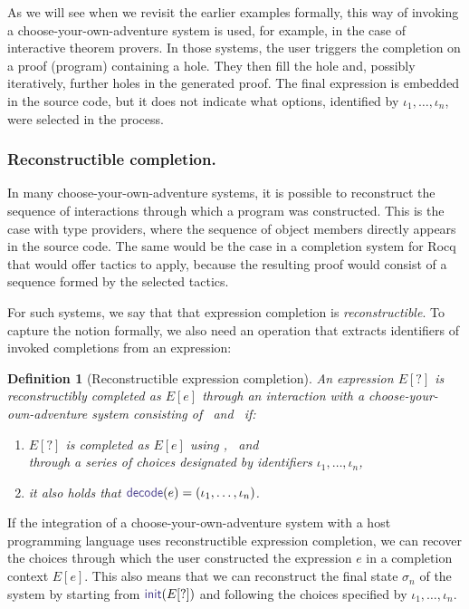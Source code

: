 \documentclass[nonacm,anonymous,sigplan,screen]{acmart}
\newcommand{\ident}[1]{\textsf{\color{DarkSlateBlue}{#1}}}
\newcommand{\select}{\textnormal{\ident{choose}}}
\newcommand{\choices}{\textnormal{\ident{choices}}}
\newtheorem{definition}{Definition}
\begin{document}
As we will see when we revisit the earlier examples formally, this way of invoking a choose-your-own-adventure
system is used, for example, in the case of interactive theorem provers.
In those systems, the user triggers the completion on a proof (program) containing a hole.
They then fill the hole and, possibly iteratively, further holes in the generated proof. The final
expression is embedded in the source code, but it does not indicate what options, identified by
$\iota_1, \ldots, \iota_n$, were selected in the process.


\subsubsection*{Reconstructible completion.}
In many choose-your-own-adventure systems, it is possible to reconstruct the sequence of interactions
through which a program was constructed. This is the case with type providers, where the
sequence of object members directly appears in the source code.
The same would be the case in a completion system for Rocq that would offer tactics to apply,
because the resulting proof would consist of a sequence formed by the selected tactics.

For such systems, we say that that expression completion is \emph{reconstructible}.
To capture the notion formally, we also need an operation
\ident{decode} that extracts identifiers of invoked completions from an expression:

\begin{definition}[Reconstructible expression completion]
An expression $E[?]$ is reconstructibly completed as $E[e]$ through an interaction with
a choose-your-own-adventure system consisting of \choices\ and \select\ if:

\begin{enumerate}
\item $E[?]$ is completed as $E[e]$ using \ident{init}, \choices\ and \select\\
  through a series of choices designated by identifiers $\iota_1, \ldots, \iota_n$,
\item it also holds that $\ident{decode}(e)=(\iota_1, \ldots, \iota_n)$.
\end{enumerate}
\end{definition}

If the integration of a choose-your-own-adventure system with a host programming language
uses reconstructible expression completion, we can recover the choices through which the user
constructed the expression $e$ in a completion context $E[e]$. This also means that we can
reconstruct the final state $\sigma_n$ of the system by starting from $\ident{init}(E[?])$
and following the choices specified by $\iota_1, \ldots, \iota_n$.
\end{document}
